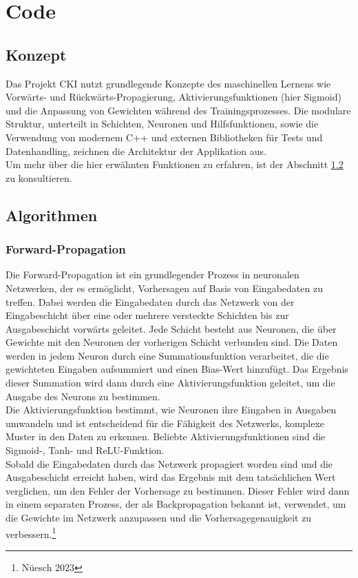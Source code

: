 \section{Code}
\label{sec:RealCode}
\subsection{Konzept}
 Das Projekt CKI nutzt grundlegende Konzepte des maschinellen Lernens wie Vorwärts- und Rückwärts-Propagierung, Aktivierungsfunktionen (hier Sigmoid) und die Anpassung von Gewichten während des Trainingsprozesses. Die modulare Struktur, unterteilt in Schichten, Neuronen und Hilfsfunktionen, sowie die Verwendung von modernem C++ und externen Bibliotheken für Tests und Datenhandling, zeichnen die Architektur der Applikation aus.
\\
Um mehr über die hier erwähnten Funktionen zu erfahren, ist der Abschnitt \ref{sec:RealAlgorithmen} zu konsultieren.


\subsection{Algorithmen}
\label{sec:RealAlgorithmen}
\subsubsection{ Forward-Propagation}
\label{sec:RealForwardPropagation}
Die Forward-Propagation ist ein grundlegender Prozess in neuronalen Netzwerken, der es ermöglicht, Vorhersagen auf Basis von Eingabedaten zu treffen. Dabei werden die Eingabedaten durch das Netzwerk von der Eingabeschicht über eine oder mehrere versteckte Schichten bis zur Ausgabeschicht vorwärts geleitet. Jede Schicht besteht aus Neuronen, die über Gewichte mit den Neuronen der vorherigen Schicht verbunden sind. Die Daten werden in jedem Neuron durch eine Summationsfunktion verarbeitet, die die gewichteten Eingaben aufsummiert und einen Bias-Wert hinzufügt. Das Ergebnis dieser Summation wird dann durch eine Aktivierungsfunktion geleitet, um die Ausgabe des Neurons zu bestimmen.
\\
Die Aktivierungsfunktion bestimmt, wie Neuronen ihre Eingaben in Ausgaben umwandeln und ist entscheidend für die Fähigkeit des Netzwerks, komplexe Muster in den Daten zu erkennen. Beliebte Aktivierungsfunktionen sind die Sigmoid-, Tanh- und ReLU-Funktion.
\\
Sobald die Eingabedaten durch das Netzwerk propagiert worden sind und die Ausgabeschicht erreicht haben, wird das Ergebnis mit dem tatsächlichen Wert verglichen, um den Fehler der Vorhersage zu bestimmen. Dieser Fehler wird dann in einem separaten Prozess, der als Backpropagation bekannt ist, verwendet, um die Gewichte im Netzwerk anzupassen und die Vorhersagegenauigkeit zu verbessern.\footnote{Nüesch 2023}
